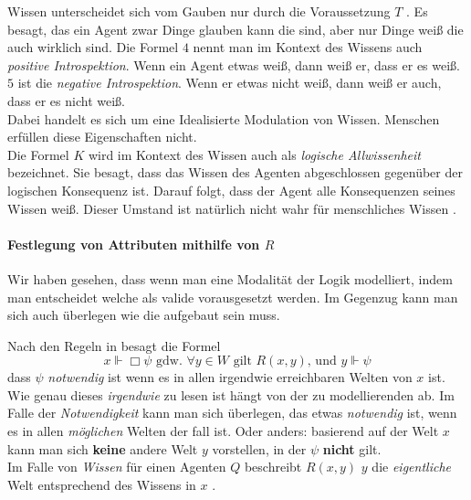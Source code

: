 Wissen unterscheidet sich vom Gauben nur durch die Voraussetzung $T$ \TFormel.
Es besagt, das ein Agent zwar Dinge glauben kann die \false sind, aber nur Dinge weiß die auch wirklich \true sind.
Die Formel $4$ \vierFormel nennt man im Kontext des Wissens auch \emph{positive Introspektion}. 
Wenn ein Agent etwas weiß, dann weiß er, dass er es weiß.
$5$ \fuenfFormel ist die \emph{negative Introspektion}. Wenn er etwas nicht weiß, dann weiß er auch, dass er es nicht weiß.\\
Dabei handelt es sich um eine Idealisierte Modulation von Wissen.
Menschen erfüllen diese Eigenschaften nicht.\\
Die Formel $K$ \KFormel wird im Kontext des Wissen auch als \emph{logische Allwissenheit} bezeichnet.
Sie besagt, dass das Wissen des Agenten abgeschlossen gegenüber der logischen Konsequenz ist.
Darauf folgt, dass der Agent alle Konsequenzen seines Wissen weiß. 
Dieser Umstand ist natürlich nicht wahr für menschliches Wissen .


\paragraph{Festlegung von Attributen mithilfe von $R$}
\label{festlegung_von_attibuten_mit_R}

Wir haben gesehen, dass wenn man eine Modalität der Logik modelliert, indem man entscheidet welche \formelSchemata als valide vorausgesetzt werden.
Im Gegenzug kann man sich auch überlegen wie die \KS aufgebaut sein muss.

Nach den Regeln in  besagt die Formel
\begin{equation*}
	x \Vdash \Box \psi \text{ gdw. }\forall y \in W \text{ gilt } R(x,y)\text{, und } y \Vdash \psi	
\end{equation*}
dass $\psi$ \emph{notwendig} ist wenn es in allen irgendwie erreichbaren Welten von $x$ \true ist.\\
Wie genau dieses \emph{irgendwie} zu lesen ist hängt von der zu modellierenden \ML ab.
Im Falle der \emph{Notwendigkeit} kann man sich überlegen, das etwas \emph{notwendig} ist, wenn es in allen \emph{möglichen} Welten der fall ist.
Oder anders: basierend auf der Welt $x$ kann man sich \textbf{keine} andere Welt $y$ vorstellen, in der $\psi$ \textbf{nicht} gilt.\\
Im Falle von \emph{Wissen} für einen Agenten $Q$ beschreibt $R(x,y)$ $y$ die \emph{eigentliche} Welt entsprechend des Wissens in $x$ .

